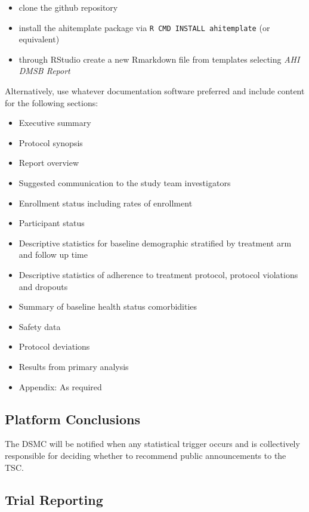 \documentclass[
]{article}
\providecommand{\tightlist}{%
  \setlength{\itemsep}{0pt}\setlength{\parskip}{0pt}}
\begin{document}
\begin{itemize}
  \item clone the github repository
  \item install the ahitemplate package via \texttt{R CMD INSTALL ahitemplate} (or equivalent)
  \item through RStudio create a new Rmarkdown file from templates selecting \textit{AHI DMSB Report}
\end{itemize}

Alternatively, use whatever documentation software preferred and include content for the following sections:

\begin{itemize}
  \tightlist
  \item
        Executive summary
  \item
        Protocol synopsis
  \item
        Report overview
  \item
        Suggested communication to the study team investigators
  \item
        Enrollment status including rates of enrollment
  \item
        Participant status
  \item
        Descriptive statistics for baseline demographic stratified by treatment arm and follow up time
  \item
        Descriptive statistics of adherence to treatment protocol, protocol violations and dropouts
  \item
        Summary of baseline health status comorbidities
  \item
        Safety data
  \item
        Protocol deviations
  \item
        Results from primary analysis
  \item
        Appendix: As required
\end{itemize}


\hypertarget{platform-conclusions}{%
  \subsection{Platform Conclusions}\label{platform-conclusions}}

The DSMC will be notified when any statistical trigger occurs and is collectively responsible for deciding whether to recommend public announcements to the TSC.

\hypertarget{trial-reporting}{%
  \subsection{Trial Reporting}\label{trial-reporting}}
\end{document}
